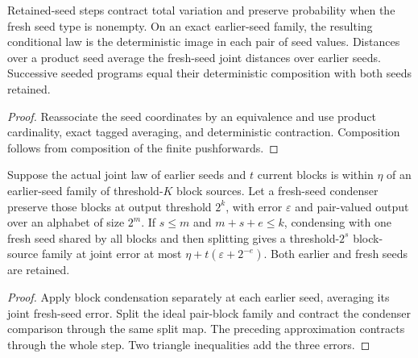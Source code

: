 \begin{theorem}
  \label{thm:lowerbounds-algebraic-retained-seed-step}
  \leanok
  Retained-seed steps contract total variation and preserve probability
  when the fresh seed type is nonempty. On an exact earlier-seed family,
  the resulting conditional law is the deterministic image in each pair
  of seed values. Distances over a product seed average the fresh-seed
  joint distances over earlier seeds. Successive seeded programs equal
  their deterministic composition with both seeds retained.
\end{theorem}
\begin{proof}
  \leanok
  Reassociate the seed coordinates by an equivalence and use product
  cardinality, exact tagged averaging, and deterministic contraction.
  Composition follows from composition of the finite pushforwards.
\end{proof}

\begin{theorem}
  \label{thm:lowerbounds-algebraic-condense-split-level}
  \leanok
  Suppose the actual joint law of earlier seeds and $t$ current blocks
  is within $\eta$ of an earlier-seed family of threshold-$K$ block sources.
  Let a fresh-seed condenser preserve those blocks at output threshold
  $2^k$, with error $\varepsilon$ and pair-valued output over an alphabet
  of size $2^m$. If $s\le m$ and $m+s+e\le k$, condensing with one fresh
  seed shared by all blocks and then splitting gives a threshold-$2^s$
  block-source family at joint error at most
  $\eta+t(\varepsilon+2^{-e})$. Both earlier and fresh seeds are retained.
\end{theorem}
\begin{proof}
  \leanok
  Apply block condensation separately at each earlier seed, averaging its
  joint fresh-seed error. Split the ideal pair-block family and contract
  the condenser comparison through the same split map. The preceding
  approximation contracts through the whole step. Two triangle inequalities
  add the three errors.
\end{proof}

